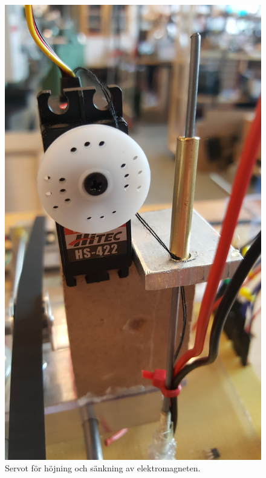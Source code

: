 \documentclass[a4paper]{article}
\begin{document}
\begin{figure}\label{servo_fram}
\centering
\includegraphics[width=\textwidth,keepaspectratio]{../images/servo_fram}
\caption{Servot för höjning och sänkning av elektromagneten.}
\end{figure}
\end{document}

